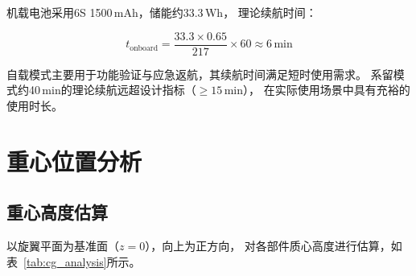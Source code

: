 机载电池采用6S 1500\,mAh，储能约33.3\,Wh，
理论续航时间：

\begin{equation}
    t_{\text{onboard}} = \frac{33.3 \times 0.65}{217} \times 60 \approx 6\,\text{min}
    \label{eq:endurance_onboard}
\end{equation}

自载模式主要用于功能验证与应急返航，其续航时间满足短时使用需求。
系留模式约40\,min的理论续航远超设计指标（$\geq 15$\,min），
在实际使用场景中具有充裕的使用时长。


\section{重心位置分析}

\subsection{重心高度估算}

以旋翼平面为基准面（$z = 0$），向上为正方向，
对各部件质心高度进行估算，如表~\ref{tab:cg_analysis}所示。

